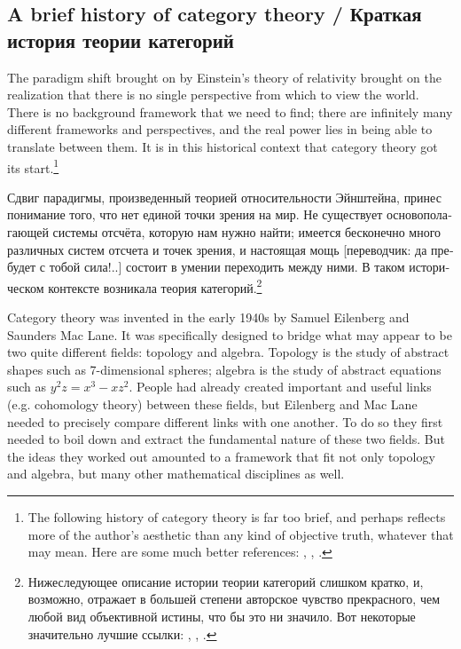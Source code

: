\documentclass[a4paper]{book}
\theoremstyle{myth}
\begin{document}
\begin{english}

\section{A brief history of category theory /  Краткая история теории категорий }

The paradigm shift brought on by Einstein's theory of relativity brought on the realization that there is no single perspective from which to view the world. There is no background framework that we need to find; there are infinitely many different frameworks and perspectives, and the real power lies in being able to translate between them. It is in this historical context that category theory got its start.\footnote{The following history of category theory is far too brief, and perhaps reflects more of the author's aesthetic than any kind of objective truth, whatever that may mean. Here are some much better references: \cite{Kro}, \cite{Mar1}, \cite{LM}.}

\begin{russian}
Сдвиг парадигмы, произведенный теорией относительности Эйнштейна, принес понимание того, что нет единой точки зрения на мир. Не существует основополагающей системы отсчёта, которую нам нужно найти; имеется бесконечно много различных систем отсчета и точек зрения, и настоящая мощь [переводчик: да пребудет с тобой сила!..] состоит в умении переходить между ними. В таком историческом контексте возникала теория категорий.\footnote{Нижеследующее описание истории теории категорий слишком кратко, и, возможно, отражает в большей степени авторское чувство прекрасного, чем любой вид объективной истины, что бы это ни значило. Вот некоторые значительно лучшие ссылки: \cite{Kro}, \cite{Mar1}, \cite{LM}.}
 \end{russian}

Category theory was invented in the early 1940s by Samuel Eilenberg and Saunders Mac Lane. It was specifically designed to bridge what may appear to be two quite different fields: topology and algebra. Topology is the study of abstract shapes such as 7-dimensional spheres; algebra is the study of abstract equations such as $y^2z=x^3-xz^2$. People had already created important and useful links (e.g. cohomology theory) between these fields, but Eilenberg and Mac Lane needed to precisely compare different links with one another. To do so they first needed to boil down and extract the fundamental nature of these two fields. But the ideas they worked out amounted to a framework that fit not only topology and algebra, but many other mathematical disciplines as well.


\end{english}
\end{document}
